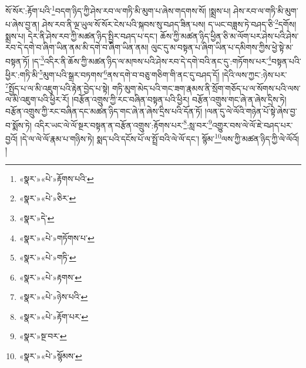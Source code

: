 སོ་སོར་:རྟོག་པའི་\footnote{«སྣར་»«པེ་»རྟོགས་པའི་}བདག་ཉིད་ཀྱི་ཤེས་རབ་ལ་གཏི་མི་མུག་པ་ཞེས་གདགས་སོ། །སྨྲས་པ། ཤེས་རབ་ལ་གཏི་མི་མུག་པ་ཞེས་བྱ་ན། ཤེས་རབ་ནི་ལྔ་ཡུལ་སོ་སོར་ངེས་པའི་སྐབས་སུ་བཤད་ཟིན་པས། ད་ཡང་བཟླས་ཏེ་བཤད་ཅི་\footnote{«སྣར་»«པེ་»ཅིར་}དགོས། སྨྲས་པ། དེར་ནི་ཤེས་རབ་ཀྱི་མཚན་ཉིད་སྤྱིར་བཤད་པ་དང་། ཆོས་ཀྱི་མཚན་ཉིད་ཕྱིན་ཅི་མ་ལོག་པར་ཤེས་པའི་ཤེས་རབ་དེ་དགེ་བ་ཞིག་ཡིན་ནམ་མི་དགེ་བ་ཞིག་ཡིན་ནམ། ལུང་དུ་མ་བསྟན་པ་ཞིག་ཡིན་པ་དམིགས་ཀྱིས་ཕྱེ་སྟེ་མ་བསྟན་ཏོ། །ད་\footnote{«སྣར་»དེ་}འདིར་ནི་ཆོས་ཀྱི་མཚན་ཉིད་ལ་མཁས་པའི་ཤེས་རབ་དེ་དགེ་བའི་ནང་དུ་:གཏོགས་པར་\footnote{«སྣར་»«པེ་»གཏོགས་པ་}བསྟན་པའི་ཕྱིར་:གཏི་མི་\footnote{«སྣར་»«པེ་»གཏི་}མུག་པའི་སྒྲར་བཏགས་\footnote{«སྣར་»«པེ་»རྟགས་}ནས་དགེ་བ་བཅུ་གཅིག་གི་ནང་དུ་བཤད་དོ། །དེའི་ལས་ཀྱང་:ཉེས་པར་\footnote{«སྣར་»«པེ་»ཉེས་པའི་}སྤྱོད་པ་ལ་མི་འཇུག་པའི་རྟེན་བྱེད་པ་སྟེ། གཏི་མུག་མེད་པའི་གང་ཟག་རྣམས་ནི་སྲོག་གཅོད་པ་ལ་སོགས་པའི་ལས་ལ་མི་འཇུག་པའི་ཕྱིར་རོ། །བརྩོན་འགྲུས་ཀྱི་རང་བཞིན་བསྟན་པའི་ཕྱིར། བརྩོན་འགྲུས་གང་ཞེ་ན་ཞེས་དྲིས་ཏེ། བརྩོན་འགྲུས་ཀྱི་རང་བཞིན་དང་མཚན་ཉིད་གང་ཞེ་ན་ཞེས་དྲིས་པའི་དོན་ཏོ། །ལན་དུ་ལེ་ལོའི་གཉེན་པོ་སྟེ་ཞེས་བྱ་བ་སྨོས་ཏེ། འདིར་ཡང་ལེ་ལོ་སྔར་བསྟན་ན་བརྩོན་འགྲུས་:རྟོགས་པར་\footnote{«སྣར་»«པེ་»རྟོག་པར་}:སླ་བར་\footnote{«སྣར་»སྔ་བར་}འགྱུར་བས་ལེ་ལོ་ཇེ་བཤད་པར་བྱའོ། །དེ་ལ་ལེ་ལོ་རྣམ་པ་གཉིས་ཏེ། སྨད་པའི་དངོས་པོ་ལ་སྤྲོ་བའི་ལེ་ལོ་དང་། སྙོམ་\footnote{«སྣར་»«པེ་»སྙོམས་}ལས་ཀྱི་མཚན་ཉིད་ཀྱི་ལེ་ལོའོ། །
